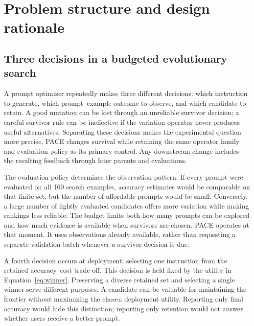 \section{Problem structure and design rationale}
\label{sec:rationale}
\subsection{Three decisions in a budgeted evolutionary search}
A prompt optimizer repeatedly makes three different decisions: which instruction
to generate, which prompt--example outcome to observe, and which candidate to
retain. A good mutation can be lost through an unreliable survivor decision;
a careful survivor rule can be ineffective if the variation operator never
produces useful alternatives. Separating these decisions makes the experimental
question more precise. PACE changes survival while retaining the same operator
family and evaluation policy as its primary control. Any downstream change
includes the resulting feedback through later parents and evaluations.

The evaluation policy determines the observation pattern. If every prompt were
evaluated on all 160 search examples, accuracy estimates would be comparable on
that finite set, but the number of affordable prompts would be small. Conversely,
a large number of lightly evaluated candidates offers more variation while
making rankings less reliable. The budget limits both how many prompts can be explored and how much evidence
is available when survivors are chosen.
PACE operates at that moment. It uses observations already available, rather
than requesting a separate validation batch whenever a survivor decision is due.

A fourth decision occurs at deployment: selecting one instruction from the
retained accuracy--cost trade-off. This decision is held fixed by the utility
in Equation~\ref{eq:winner}. Preserving a diverse retained set and selecting a
single winner serve different purposes. A candidate can be valuable for
maintaining the frontier without maximizing the chosen deployment utility.
Reporting only final accuracy would hide this distinction; reporting only
retention would not answer whether users receive a better prompt.


